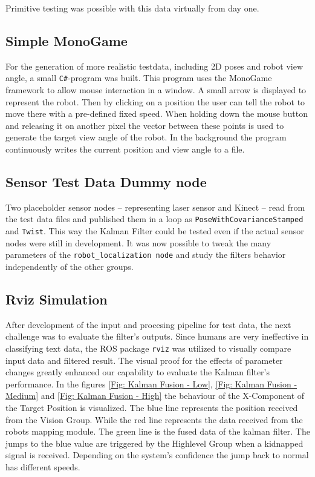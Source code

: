Primitive testing was possible with this data virtually from day one.

\subsection{Simple MonoGame}
For the generation of more realistic testdata, including 2D poses and robot view angle, a small \texttt{C\#}-program was built. This program uses the MonoGame framework to allow mouse interaction in a window. A small arrow is displayed to represent the robot. Then by clicking on a position the user can tell the robot to move there with a pre-defined fixed speed. When holding down the mouse button and releasing it on another pixel the vector between these points is used to generate the target view angle of the robot. In the background the program continuously writes the current position and view angle to a file.

\subsection{Sensor Test Data Dummy node}
Two placeholder sensor nodes -- representing laser sensor and Kinect -- read from the test data files and published them in a loop as \texttt{PoseWithCovarianceStamped} and \texttt{Twist}. This way the Kalman Filter could be tested even if the actual sensor nodes were still in development. It was now possible to tweak the many parameters of the \texttt{robot\_localization node} and study the filters behavior independently of the other groups.

\subsection{Rviz Simulation}
After development of the input and procesing pipeline for test data, the next challenge was to evaluate the filter's outputs. Since humans are very ineffective in classifying text data, the ROS package \texttt{rviz} was utilized to visually compare input data and filtered result. The visual proof for the effects of parameter changes greatly enhanced our capability to evaluate the Kalman filter's performance. In the figures \ref{Fig: Kalman Fusion - Low}, \ref{Fig: Kalman Fusion - Medium} and \ref{Fig: Kalman Fusion - High} the behaviour of the X-Component of the Target Position is visualized. The blue line represents the position received from the Vision Group. While the red line represents the data received from the robots mapping module. The green line is the fused data of the kalman filter. The jumps to the blue value are triggered by the Highlevel Group when a kidnapped signal is received. Depending on the system's confidence the jump back to normal has different speeds.

